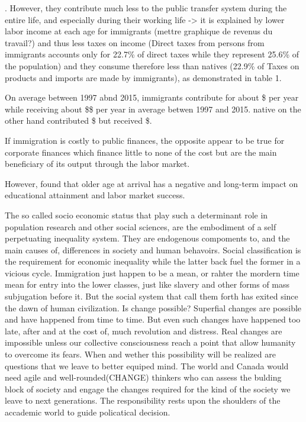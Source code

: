 .
However, they contribute much less to the public transfer system during the entire life, and especially during their working life -> it is explained by lower labor  income at each age for immigrants (mettre graphique de revenus du travail?) and thus less taxes on income (Direct taxes from persons from immigrants accounts only for 22.7\% of direct taxes while they represent 25.6\% of the population) and they consume therefore less than natives (22.9\% of Taxes on products and imports are made by immigrants), as demonstrated in table 1.

On average between 1997 abnd 2015, immigrants contribute for about \$ per year while receiving about \$\$ per year in average betwen 1997 and 2015. native on the other hand contributed \$ but received \$.

If immigration is costly to public finances, the opposite appear to be true for corporate finances which finance little to none of the cost but are the main beneficiary of its output through the labor  market.




However, \citet{Hermansen:2017ht} found that older age at arrival has a negative and long-term impact on educational attainment and labor  market success.

\vspace{0.7em}\par
The so called socio economic status that play such a determinant role in population research and other social sciences, are the embodiment of a self perpetuating inequality system. They are endogenous compoments to, and the main causes of, differences in society and human behavoirs. Social classification is the requirement for economic inequality while the latter back fuel the former in a vicious cycle. Immigration just happen to be a mean, or rahter the mordern time mean for entry into the lower classes, just like slavery and other forms of mass subjugation before it. But the social system that call them forth has exited since the dawn of human civilization. Is change possible? Superfial changes are possible and have happened from time to time. But even such changes have happened too late, after and at the cost of, much revolution and distress. Real changes are impossible unless our collective consciousness reach a point that allow humanity to overcome its fears. When and wether this possibility will be realized are questions that we leave to better equiped mind. The world and Canada would need agile and well-rounded(CHANGE) thinkers who can assess the bulding block of society and engage the changes required for the kind of the society we leave to next generations. The responsibility rests upon the shoulders of the accademic world to guide policatical decision.





